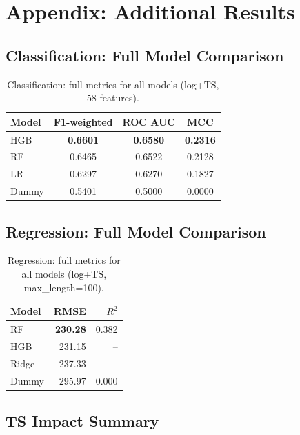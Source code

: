\documentclass[runningheads]{llncs}
\begin{document}
\section{Appendix: Additional Results}
\label{app:additional-results}

\subsection{Classification: Full Model Comparison}

\begin{table}[H]
    \centering
    \caption{Classification: full metrics for all models (log+TS, 58 features).}
    \label{tab:app-classification}
    \begin{tabularx}{0.85\textwidth}{lccc}
        \toprule
        Model & F1-weighted & ROC AUC & MCC \\
        \midrule
        HGB & \textbf{0.6601} & \textbf{0.6580} & \textbf{0.2316} \\
        RF  & 0.6465 & 0.6522 & 0.2128 \\
        LR  & 0.6297 & 0.6270 & 0.1827 \\
        Dummy & 0.5401 & 0.5000 & 0.0000 \\
        \bottomrule
    \end{tabularx}
\end{table}

\subsection{Regression: Full Model Comparison}

\begin{table}[H]
    \centering
    \caption{Regression: full metrics for all models (log+TS, max\_length=100).}
    \label{tab:app-regression}
    \begin{tabularx}{0.75\textwidth}{lrr}
        \toprule
        Model & RMSE & $R^2$ \\
        \midrule
        RF  & \textbf{230.28} & 0.382 \\
        HGB & 231.15 & -- \\
        Ridge & 237.33 & -- \\
        Dummy & 295.97 & 0.000 \\
        \bottomrule
    \end{tabularx}
\end{table}

\subsection{TS Impact Summary}
\end{document}
